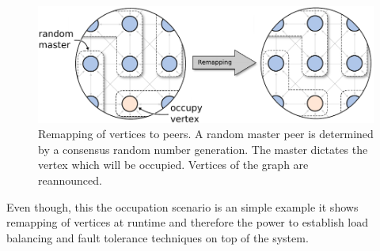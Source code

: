   \begin{figure}[H]
    \centering
    \includegraphics[width=\textwidth]{graphics/40_gol_remapping}
    \caption{Remapping of vertices to peers. A random master peer is
      determined by a consensus random number generation. The master
      dictates the vertex which will be occupied. Vertices of the
      graph are reannounced.}
    \label{fig:gol_remapping}
  \end{figure}



Even though, this the occupation scenario is an simple example it
shows remapping of vertices at runtime and therefore the power
to establish load balancing and fault tolerance techniques on
top of the system.

\cleardoublepage

